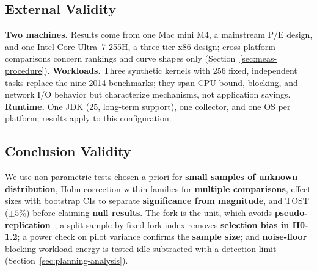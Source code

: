 \subsection{External Validity}
\textbf{Two machines.} Results come from one Mac mini M4, a mainstream P/E design, and one Intel Core Ultra~7 255H, a three-tier x86 design; cross-platform comparisons concern rankings and curve shapes only (Section~\ref{sec:meas-procedure}). \textbf{Workloads.} Three synthetic kernels with 256 fixed, independent tasks replace the nine 2014 benchmarks; they span CPU-bound, blocking, and network I/O behavior but characterize mechanisms, not application savings. \textbf{Runtime.} One JDK (25, long-term support), one collector, and one OS per platform; results apply to this configuration. 

\subsection{Conclusion Validity}
We use non-parametric tests chosen a priori for \textbf{small samples of unknown distribution}, Holm correction within families for \textbf{multiple comparisons}, effect sizes with bootstrap CIs to separate \textbf{significance from magnitude}, and TOST ($\pm 5\%$) before claiming \textbf{null results}. The fork is the unit, which avoids \textbf{pseudo-replication}~\cite{georges2007rigorous}; a split sample by fixed fork index removes \textbf{selection bias in H0-1.2}; a power check on pilot variance confirms the \textbf{sample size}; and \textbf{noise-floor} blocking-workload energy is tested idle-subtracted with a detection limit (Section~\ref{sec:planning-analysis}). 

